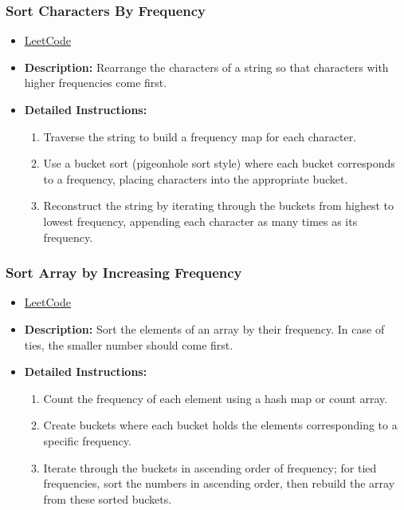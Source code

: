\subsubsection{Sort Characters By Frequency}
\begin{itemize}
    \item \href{https://leetcode.com/problems/sort-characters-by-frequency/}{LeetCode}
    \item \textbf{Description:} Rearrange the characters of a string so that characters with higher frequencies come first.
    \item \textbf{Detailed Instructions:}
    \begin{enumerate}
        \item Traverse the string to build a frequency map for each character.
        \item Use a bucket sort (pigeonhole sort style) where each bucket corresponds to a frequency, placing characters into the appropriate bucket.
        \item Reconstruct the string by iterating through the buckets from highest to lowest frequency, appending each character as many times as its frequency.
    \end{enumerate}
\end{itemize}

\subsubsection{Sort Array by Increasing Frequency}
\begin{itemize}
    \item \href{https://leetcode.com/problems/sort-array-by-increasing-frequency/}{LeetCode}
    \item \textbf{Description:} Sort the elements of an array by their frequency. In case of ties, the smaller number should come first.
    \item \textbf{Detailed Instructions:}
    \begin{enumerate}
        \item Count the frequency of each element using a hash map or count array.
        \item Create buckets where each bucket holds the elements corresponding to a specific frequency.
        \item Iterate through the buckets in ascending order of frequency; for tied frequencies, sort the numbers in ascending order, then rebuild the array from these sorted buckets.
    \end{enumerate}
\end{itemize}

